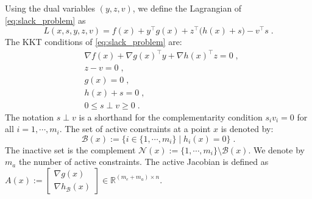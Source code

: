 \documentclass[smallextended]{svjour3}
\begin{document}
Using the dual variables $(y, z, v)$, we define the Lagrangian of \eqref{eq:slack_problem} as
\begin{equation}
  \label{eq:lagrangian}
  L(x, s, y, z, v) = f(x) + y^\top g(x) + z^\top \big(h(x) +s\big)
  - v^\top s \; .
\end{equation}
The KKT conditions of \eqref{eq:slack_problem} are:
\begin{subequations}
  \label{eq:kktconditions}
    \begin{align}
      & \nabla f(x) + \nabla g(x)^\top y + \nabla h(x)^\top z  = 0 \; , \\
      & z - v = 0 \; , \\
      & g(x) = 0 \; , \\
      & h(x) + s = 0 \; , \\
      \label{eq:kktconditions:comps}
      & 0 \leq s \perp v \geq 0 \; .
    \end{align}
\end{subequations}
The notation $s \perp v$ is a shorthand for the complementarity
condition $s_i v_i = 0$ for all $i=1,\cdots, m_i$.
The set of active constraints at a point $x$ is denoted by:
\begin{equation}
  \mathcal{B}(x) := \{ i \in\{ 1, \cdots, m_i\} \; | \; h_i(x) = 0 \} \; .
\end{equation}
The inactive set is the complement $\mathcal{N}(x) := \{1, \cdots, m_i \} \setminus \mathcal{B}(x)$.
We denote by $m_a$ the number of active constraints.
The active Jacobian is defined as $A(x) := \begin{bmatrix} \nabla g(x) \\ \nabla h_{\mathcal{B}}(x) \end{bmatrix} \in \mathbb{R}^{(m_e + m_a) \times n}$.
\end{document}

